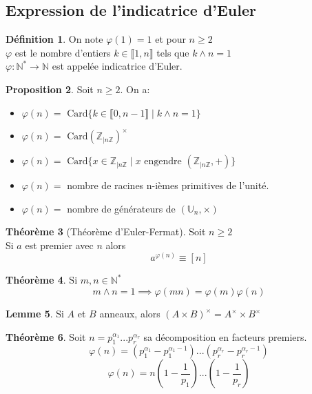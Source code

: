 \documentclass[10pt,a4paper]{article}
\theoremstyle{definition}
\newtheorem{proposition}{Proposition}[section]
\newtheorem{theorem}[proposition]{Théorème}
\newtheorem{lemme}[proposition]{Lemme}
\newtheorem{definition}[proposition]{Définition}
\begin{document}
\subsection{Expression de l'indicatrice d'Euler}
\begin{definition}
On note $\varphi(1) = 1$ et pour $n \geq 2$ \\
$\varphi$ est le nombre d'entiers $k \in \llbracket 1, n \rrbracket$ tels que $k \wedge n = 1$ \\
$\varphi: \mathbb{N}^* \to \mathbb{N}$ est appelée indicatrice d'Euler.
\end{definition}
\begin{proposition}
Soit $n \geq 2$. On a:
\begin{itemize}
\item $\varphi(n) = \text{ Card} \{k \in \llbracket 0, n - 1 \rrbracket \mid k \wedge n = 1 \}$
\item $\varphi(n) = \text{ Card} (\mathbb{Z}_{|n \mathbb{Z}})^\times$
\item $\varphi(n) = \text{ Card} \{x \in \mathbb{Z}_{|n\mathbb{Z}} \mid x \text{ engendre } (\mathbb{Z}_{|n\mathbb{Z}}, +) \}$
\item $\varphi(n) =$ nombre de racines n-ièmes primitives de l'unité.
\item $\varphi(n) =$ nombre de générateurs de $(\mathbb{U}_n, \times)$
\end{itemize}
\end{proposition}
\begin{theorem}[Théorème d'Euler-Fermat]
Soit $n \geq 2$ \\
Si $a$ est premier avec $n$ alors
\[ a^{\varphi(n)} \equiv [n] \]
\end{theorem}
\begin{theorem}
Si $m, n \in \mathbb{N}^*$
\[ m \wedge n = 1 \implies \varphi(mn) = \varphi(m) \varphi(n) \]
\end{theorem}
\begin{lemme}
Si $A$ et $B$ anneaux, alors $(A \times B)^\times = A^\times \times B^\times$
\end{lemme}
\begin{theorem}
Soit $n = p_1^{\alpha_1} ... p_r^{\alpha_r}$ sa décomposition en facteurs premiers.
\[ \varphi(n) = \left(p_1^{\alpha_1} - p_1^{\alpha_1 - 1}\right) ... \left(p_r^{\alpha_r} - p_r^{\alpha_r - 1}\right) \]
\[ \varphi(n) = n \left( 1 - \frac{1}{p_1} \right) ... \left( 1 - \frac{1}{p_r} \right) \]
\end{theorem}
\end{document}
